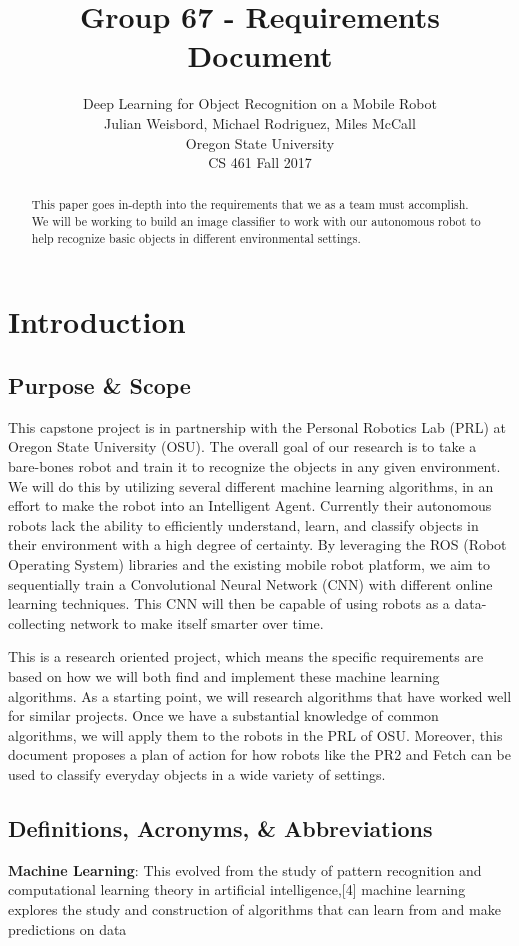 \documentclass[draftclsnofoot, onecolumn, 10pt, compsoc]{IEEEtran}
\title{Group 67 - Requirements Document}
\author{
	Deep Learning for Object Recognition on a Mobile Robot \\
	Julian Weisbord, Michael Rodriguez, Miles McCall \\
	Oregon State University \\
	CS 461 Fall 2017
}
\begin{document}
\maketitle

\begin{abstract}
	\noindent This paper goes in-depth into the requirements that we as a team must accomplish. We will be working to build an image classifier to work with our autonomous robot to help recognize basic objects in different environmental settings. 
\end{abstract}
\newpage

\tableofcontents
\newpage

\section{Introduction}
	\subsection{Purpose \& Scope}
		This capstone project is in partnership with the Personal Robotics Lab (PRL) at Oregon State University (OSU). The overall goal of our research is to take a bare-bones robot and train it to recognize the objects in any given environment. We will do this by utilizing several different machine learning algorithms, in an effort to make the robot into an Intelligent Agent. Currently their autonomous robots lack the ability to efficiently understand, learn, and classify objects in their environment with a high degree of certainty. By leveraging the ROS (Robot Operating System) libraries and the existing mobile robot platform, we aim to sequentially train a Convolutional Neural Network (CNN) with different online learning techniques. This CNN will then be capable of using robots as a data-collecting network to make itself smarter over time. 
		
		This is a research oriented project, which means the specific requirements are based on how we will both find and implement these machine learning algorithms. As a starting point, we will research algorithms that have worked well for similar projects. Once we have a substantial knowledge of common algorithms, we will apply them to the robots in the PRL of OSU. Moreover, this document proposes a plan of action for how robots like the PR2 and Fetch can be used to classify everyday objects in a wide variety of settings.
		
	\subsection{Definitions, Acronyms, \& Abbreviations}
		\textbf{Machine Learning}: This evolved from the study of pattern recognition and computational learning theory in artificial intelligence,[4] machine learning explores the study and construction of algorithms that can learn from and make predictions on data
		
\end{document}
